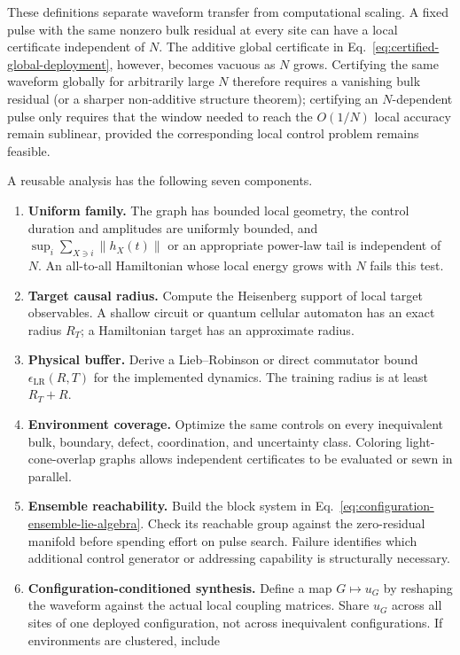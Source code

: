 These definitions separate waveform transfer from computational scaling.  A
fixed pulse with the same nonzero bulk residual at every site can have a local
certificate independent of $N$.  The additive global certificate in
Eq.~\eqref{eq:certified-global-deployment}, however, becomes vacuous as $N$
grows.  Certifying the same waveform globally for arbitrarily large $N$
therefore requires a vanishing bulk residual (or a sharper non-additive
structure theorem); certifying an $N$-dependent pulse only requires that the
window needed to reach the $O(1/N)$ local accuracy remain sublinear, provided
the corresponding local control problem remains feasible.

A reusable analysis has the following seven components.
\begin{enumerate}
\item \textbf{Uniform family.}  The graph has bounded local geometry, the
control duration and amplitudes are uniformly bounded, and
$\sup_i\sum_{X\ni i}\|h_X(t)\|$ or an appropriate power-law tail is independent
of $N$.  An all-to-all Hamiltonian whose local energy grows with $N$ fails this
test.
\item \textbf{Target causal radius.}  Compute the Heisenberg support of local
target observables.  A shallow circuit or quantum cellular automaton has an
exact radius $R_T$; a Hamiltonian target has an approximate radius.
\item \textbf{Physical buffer.}  Derive a Lieb--Robinson or direct commutator
bound $\epsilon_{\mathrm{LR}}(R,T)$ for the implemented dynamics.  The
training radius is at least $R_T+R$.
\item \textbf{Environment coverage.}  Optimize the same controls on every
inequivalent bulk, boundary, defect, coordination, and uncertainty class.
Coloring light-cone-overlap graphs allows independent certificates to be
evaluated or sewn in parallel.
\item \textbf{Ensemble reachability.}  Build the block system in
Eq.~\eqref{eq:configuration-ensemble-lie-algebra}.  Check its reachable group
against the zero-residual manifold before spending effort on pulse search.
Failure identifies which additional control generator or addressing
capability is structurally necessary.
\item \textbf{Configuration-conditioned synthesis.}  Define a map
$G\mapsto u_G$ by reshaping the waveform against the actual local coupling
matrices.  Share $u_G$ across all sites of one deployed configuration, not
across inequivalent configurations.  If environments are clustered, include

\end{enumerate}
